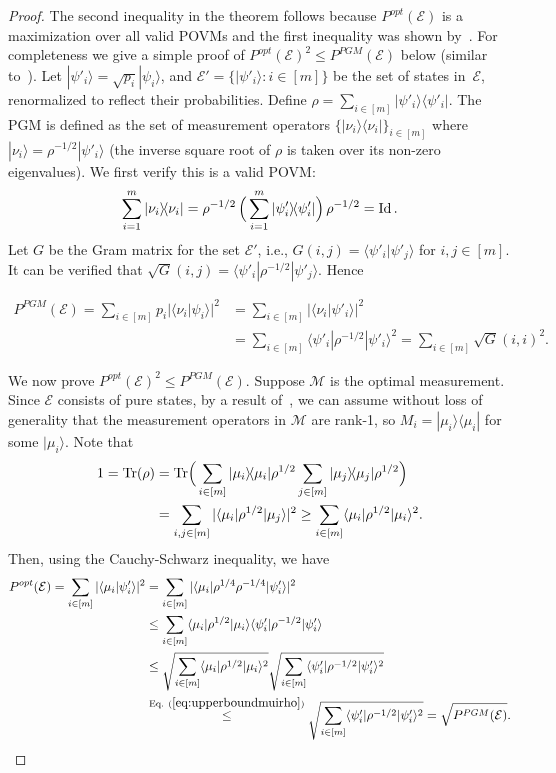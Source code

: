 \documentclass[twoside,11pt]{article}
\newcommand{\ket}[1]{|#1\rangle}
\newcommand{\bra}[1]{\langle#1|}
\newcommand{\ip}[2]{\langle #1 | #2 \rangle}
\newcommand{\ketbra}[2]{|#1\rangle\! \langle #2|}
\newcommand{\braketbra}[3]{\langle #1|#2| #3 \rangle}
\newcommand{\Tr}{\mbox{\rm Tr}}
\newcommand{\Id}{\ensuremath{\mathop{\rm Id}\nolimits}}
\newcommand{\E}{\mathcal{E}}
\newcommand{\M}{\mathcal{M}}
\begin{document}
\begin{proof}
The second inequality in the theorem follows because $P^{opt}(\E)$ is a maximization over all valid POVMs and the first inequality was shown by~\cite{barnum:pgmmeasurement}. For completeness we give a simple proof of $P^{opt}(\E)^2 \leq P^{PGM}(\E)$ below (similar to~\cite{montanaro:distinguishability}). Let $\ket{\psi'_i}=\sqrt{p_i}\ket{\psi_i}$, and $\E'=\{\ket{\psi'_i} : i\in [m]\}$ be the set of states in~$\E$, renormalized to reflect their probabilities. Define $\rho=\sum_{i\in [m]} \ketbra{\psi'_i}{\psi'_i}$. The PGM is defined as the set of measurement operators $\{\ketbra{\nu_i}{\nu_i}\}_{i\in [m]}$ where $\ket{\nu_i}=\rho^{-1/2}\ket{\psi'_i}$ (the inverse square root of $\rho$ is taken over its non-zero eigenvalues). We first verify this is a valid POVM: 
$$
\sum_{i=1}^{m} \ketbra{\nu_i}{\nu_i}= \rho^{-1/2}\,\Big(\sum_{i=1}^{m} \ketbra{\psi'_i}{\psi'_i}\Big)\,\rho^{-1/2}=\Id.
$$
Let $G$ be the Gram matrix for the set $\E'$, i.e., $G(i,j)=\ip{\psi'_i}{\psi'_j}$ for $i,j\in [m]$. It can be verified that $\sqrt{G}(i,j)=\braketbra{\psi'_i}{\rho^{-1/2}}{\psi'_j}$. Hence 

\begin{align*}
P^{PGM}(\E)=\sum_{i\in [m]} p_i|\ip{\nu_i}{\psi_i}|^2&=\sum_{i\in [m]} |\ip{\nu_i}{\psi'_i}|^2\\
&=\sum_{i\in [m]} \braketbra{\psi'_i}{\rho^{-1/2}}{\psi'_i}^2=\sum_{i\in [m]} \sqrt{G}(i,i)^2.
\end{align*}

We now prove $P^{opt}(\E)^2 \leq P^{PGM}(\E)$. Suppose $\M$ is the optimal measurement. Since $\E$ consists of pure states, by a result of~\cite{eldar:optimalquantumdetectors}, we can assume without loss of generality that the measurement operators in $\M$ are rank-1, so $M_i=\ketbra{\mu_i}{\mu_i}$ for some $\ket{\mu_i}$. 
Note that 
\begin{align}
\label{eq:upperboundmuirho}
\begin{aligned}
1=\Tr(\rho)&=\Tr\Big(\sum_{i\in[m]}\ketbra{\mu_i}{\mu_i}\rho^{1/2}\sum_{j\in[m]}\ketbra{\mu_j}{\mu_j}\rho^{1/2}\Big)\\
&=\sum_{i,j\in[m]}|\bra{\mu_i}\rho^{1/2}\ket{\mu_j}|^2\geq\sum_{i\in [m]}\bra{\mu_i}\rho^{1/2}\ket{\mu_i}^2.
\end{aligned}
\end{align}
Then, using the Cauchy-Schwarz inequality, we have
\begin{align*}
P^{opt}(\E)=\sum_{i\in [m]} |\ip{\mu_i}{\psi'_i}|^2&=\sum_{i\in [m]} |\braketbra{\mu_i}{\rho^{1/4}\rho^{-1/4}}{\psi'_i}|^2 \\
&\leq \sum_{i\in [m]} \braketbra{\mu_i}{\rho^{1/2}}{\mu_i}\braketbra{\psi'_i}{\rho^{-1/2}}{\psi'_i} \\
&\leq \sqrt{ \sum_{i\in [m]}  \braketbra{\mu_i}{\rho^{1/2}}{\mu_i}^2}\sqrt{ \sum_{i\in [m]} \braketbra{\psi'_i}{\rho^{-1/2}}{\psi'_i}^2} \\
&\stackrel{\text{Eq.}~(\ref{eq:upperboundmuirho})}{\leq} \sqrt{ \sum_{i\in [m]} \braketbra{\psi'_i}{\rho^{-1/2}}{\psi'_i}^2}= \sqrt{P^{PGM}(\E)}.
\end{align*}
\end{proof}
\end{document}
